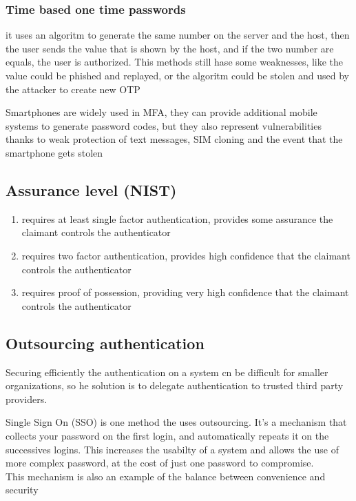 \documentclass[12pt, a4paper]{article}
\begin{document}
\subsubsection{Time based one time passwords}
it uses an algoritm to generate the same number on the server and the host, then the user sends the value that is shown 
by the host, and if the two number are equals, the user is authorized. This methods still hase some weaknesses, like the
value could be phished and replayed, or the algoritm could be stolen and used by the attacker to create new OTP

Smartphones are widely used in MFA, they can provide additional mobile systems to generate password codes, but they also 
represent vulnerabilities thanks to weak protection of text messages, SIM cloning and the event that the smartphone gets 
stolen

\subsection{Assurance level (NIST)}
\begin{enumerate}
    \item requires at least single factor authentication, provides some assurance the claimant controls the authenticator
    \item requires two factor authentication, provides high confidence that the claimant controls the authenticator
    \item requires proof of possession, providing very high confidence that the claimant controls the authenticator
\end{enumerate}

\subsection{Outsourcing authentication}
Securing efficiently the authentication on a system cn be difficult for smaller organizations, so he solution is to 
delegate authentication to trusted third party providers. 

Single Sign On (SSO) is one method the uses outsourcing. It's a mechanism that collects your password on the first
login, and automatically repeats it on the successives logins. This increases the usabilty of a system and allows the 
use of more complex password, at the cost of just one password to compromise.\\This mechanism is also an example of the balance
between convenience and security
\end{document}
